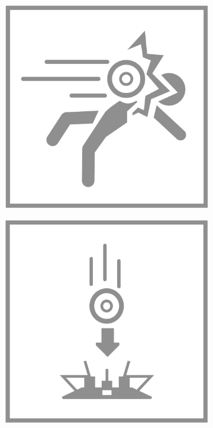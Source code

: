 \begin{figure}[H]
\begin{subfigure}[l]{0.195\linewidth}
  \end{subfigure}
  \begin{subfigure}[l]{0.195\linewidth}
    \includegraphics[width=\textwidth]{Sources/PortalIcons/d3.jpg}
  \end{subfigure}
  \begin{subfigure}[l]{0.195\linewidth}
    \includegraphics[width=\textwidth]{Sources/PortalIcons/d4.jpg}

\end{subfigure}
\end{figure}
